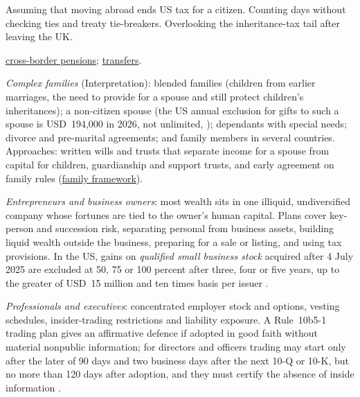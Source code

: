 \begin{qfmethod}
 Assuming that moving abroad ends US tax for a citizen. Counting days without checking ties and treaty tie-breakers. Overlooking the inheritance-tax tail after leaving the UK.

 \hyperref[meth:retirement-across-jurisdictions]{cross-border pensions}; \hyperref[meth:wealth-transfer-strategies]{transfers}.

\end{qfmethod}

\begin{qfmethod}\label{meth:complex-client-situations}
 \emph{Complex families} (Interpretation): blended families (children from earlier marriages, the need to provide for a spouse and still protect children's inheritances); a non-citizen spouse (the US annual exclusion for gifts to such a spouse is USD~194,000 in 2026, not unlimited, \citep[sec.~4.42(2)]{irs-rev-proc-2025-32}); dependants with special needs; divorce and pre-marital agreements; and family members in several countries. Approaches: written wills and trusts that separate income for a spouse from capital for children, guardianship and support trusts, and early agreement on family rules (\hyperref[meth:advising-families]{family framework}).

\emph{Entrepreneurs and business owners}: most wealth sits in one illiquid, undiversified company whose fortunes are tied to the owner's human capital. Plans cover key-person and succession risk, separating personal from business assets, building liquid wealth outside the business, preparing for a sale or listing, and using tax provisions. In the US, gains on \emph{qualified small business stock} acquired after 4 July 2025 are excluded at 50, 75 or 100 percent after three, four or five years, up to the greater of USD~15 million and ten times basis per issuer \citep[sec.~1202(a)(1), (a)(5), (b)(1), (b)(4)]{us-internal-revenue-code-26}.

\emph{Professionals and executives}: concentrated employer stock and options, vesting schedules, insider-trading restrictions and liability exposure. A Rule~10b5-1 trading plan gives an affirmative defence if adopted in good faith without material nonpublic information; for directors and officers trading may start only after the later of 90 days and two business days after the next 10-Q or 10-K, but no more than 120 days after adoption, and they must certify the absence of inside information \citep[para.~(c)(1)(ii)(B)]{sec-rule-10b5-1}.


\end{qfmethod}
